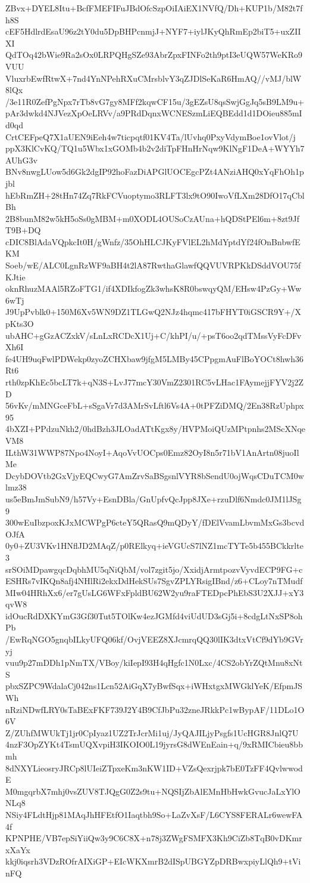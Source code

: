 ZBvx+DYEL8Itu+BcfFMEFIFuJBdOfcSzpOiIAiEX1NVfQ/Dh+KUP1b/M82t7fh8S
cEF5HdlrdEsaU96z2tY0du5DpBHPcnmjJ+NYF7+iylJKyQhRmEp2biT5+uxZIIXI
QdTOq42bWie9Ra2sOx0LRPQHgSZe93AbrZpxFINFo2th9ptI3eUQW57WeKRo9VUU
VluxrbEwfRtwX+7nd4YnNPehRXuCMrsblvY3qZJDlSeKaR6HmAQ//vMJ/blW8lQx
/3e11R0ZefPgNpx7rTb8vG7gy8MFf2kqwCF15u/3gEZsU8qsSwjGgJq5sB9LM9u+
pAr3dwkd4NJVezXpOeLRVv/a9PRdDqnxWCNESzmLiEQBEdd1d1DOieu885mId0qd
CrtCEFpeQ7X1aUEN9iEeh4w7ticpqtf01KV4Ta/lUvhq0PxyVdymBoe1ovVlot/j
ppX3KlCvKQ/TQ1u5Wbx1xGOMb4b2v2diTpFHnHrNqw9KlNgF1DeA+WYYh7AUhG3v
BNv8nwgLUow5d6Gk2dgIP92hoFazDiAPGlUOCEgcPZt4ANziAHQ0xYqFhOh1pjbl
hEbRmZH+28tHn74Zq7RkFCVuoptymo3RLFT3lx9tO90IwoVfLXm28DfO17qCblBh
2B8bunM82w5kH5oSs0gMBM+m0XODL4OUSoCzAUna+hQDStPEl6m+8zt9JfT9B+DQ
cDIC8BlAdaVQpkcIt0H/gWnfz/35OhHLCJKyFVlEL2hMdYptdYf24fOnBnbwfEKM
Soeb/wE/ALC0LgnRzWF9aBH4t2lA87RwthaGlawfQQVUVRPKkDSddVOU75fKJtie
oknRhuzMAAl5RZoFTG1/if4XDIkfogZk3whsK8R0bswqyQM/EHsw4PzGy+Ww6wTj
J9UpPvblk0+150M6Xv5WN9DZ1TLGwQ2NJz4hqmc417bFHYT0iGSCR9Y+/XpKts3O
ubAHC+gGzACZxkV/sLnLxRCDcX1Uj+C/khPI/u/+psT6oo2qdTMssVyFcDFvXh6I
fe4UH9uqFwlPDWekp0zyoZCHXbaw9jfgM5LMBy45CPpgmAuFlBoYOCt8hwh36Rt6
rth0zpKhEc5bcLT7k+qN3S+LvJ77mcY30VmZ2301RC5vLHac1FAymejjFYV2j2ZD
56vKv/mMNGceFbL+sSgaVr7d3AMrSvLftl6Vs4A+0tPFZiDMQ/2En38RzUphpx95
4bXZI+PPdzuNkh2/0hdBzh3JLOadATtKgx8y/HVPMoiQUzMPtpnhs2MScXNqeVM8
ILthW31WWP87Npo4NoyI+AqoVvUOCps0Emz82OyI8n5r71bV1AnArtn08juoIlMe
DcybDOVtb2GxVjyEQCwyG7AmZrvSaBSgsnlVYR8bSendU0ojWqsCDuTCM0wlmz38
us5eBmJmSubN9/h57Vy+EsnDBla/GnUpfvQcJpp8JXe+rzuDlf6Nmdc0JM1lJSg9
300wEuIbzpoxKJxMCWPgP6cteY5QRasQ9mQDyY/fDElVvamLbvmMxGs3bcvdOJfA
0y0+ZU3VKv1HNflJD2MAqZ/p0RElkyq+ieVGUcS7lNZ1mcTYTe5b455BCkkrlte3
srSOiMDpawgqcDqbhMU5qNiQbM/vol7zgit5jo/XxidjArmtpozvVyvdECP9FG+c
ESHRs7vIKQn8afj4NHlRi2ekxDdHekSUs7SgvZPLYRsigIBnd/z6+CLoy7nTMudf
MIw04HRhXx6/er7gUsLG6WFxFpldBU62W2yu9raFTEDpcPhEbS3U2XJJ+xY3qvW8
idOucRdDXKYmG3Gf30Tut5TOlKw4ezJGMfd4viUdUD3sGj5i+8cdgLtNxSP8ohPb
/EwRqNGO5gnqbILkyUFQ06kf/OvjVEEZ8XJcmrqQQ30lIK3dtxVtCf9dYb9GVryj
vuu9p27mDDh1pNmTX/VBoy/kiIepI93H4qHgfc1N0Lxc/4CS2obYrZQtMnu8xNtS
pbxSZPC9WdalaCj042ns1Lcn52AiGqX7yBwfSqx+iWHxtgxMWGklYeK/EfpmJSWh
nRziNDwfLRY0sTaBExFKF739J2Y4B9CfJbPu32zneJRkkPc1wBypAF/11DLo1O6V
Z/ZUhfMWUkTj1jr0CpIyaz1UZ2TrJcrMi1uj/JyQAJILjyPsgfs1UcHGR8JnlQ7U
4nzF3OpZYKt4TsmUQXvpiH3IKOIO0L19jyrsG8dWEnEain+q/9xRMICbieu8bbmh
8dNXYLieosryJRCp8lUIeiZTpxeKm3nKW1ID+VZsQexrjpk7bE0TzFF4QvlwwodE
M0mgqrbX7mhj0vsZUV8TJQgG0Z2s9tu+NQSIjZbAlEMnHbHwkGvucJaLxYlONLq8
NSiy4FLdtHjp81MAqJhHFEtfO1Iaqtbh9So+LaZvXsF/L6CYS8FERALr6wewFA4f
KPNPHE/VB7epSiYiiQw3y9C6C8X+n78j3ZWgFSMFX3Kh9CiZb8TqB0vDKmrxXaYx
kkj0iqsrh3VDzROfrAIXiGP+EIcWKXmrB2dISpUBGYZpDRBwxpiyLlQh9+tVinFQ
